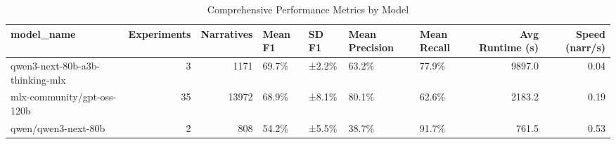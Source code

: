 \begin{table}[H]
\centering
\caption{\label{tab:export-tables}Comprehensive Performance Metrics by Model}
\centering
\begin{tabular}[t]{lrrllllrr}
\toprule
model\_name & Experiments & Narratives & Mean F1 & SD F1 & Mean Precision & Mean Recall & Avg Runtime (s) & Speed (narr/s)\\
\midrule
qwen3-next-80b-a3b-thinking-mlx & 3 & 1171 & 69.7\% & ±2.2\% & 63.2\% & 77.9\% & 9897.0 & 0.04\\
mlx-community/gpt-oss-120b & 35 & 13972 & 68.9\% & ±8.1\% & 80.1\% & 62.6\% & 2183.2 & 0.19\\
qwen/qwen3-next-80b & 2 & 808 & 54.2\% & ±5.5\% & 38.7\% & 91.7\% & 761.5 & 0.53\\
\bottomrule
\end{tabular}
\end{table}
